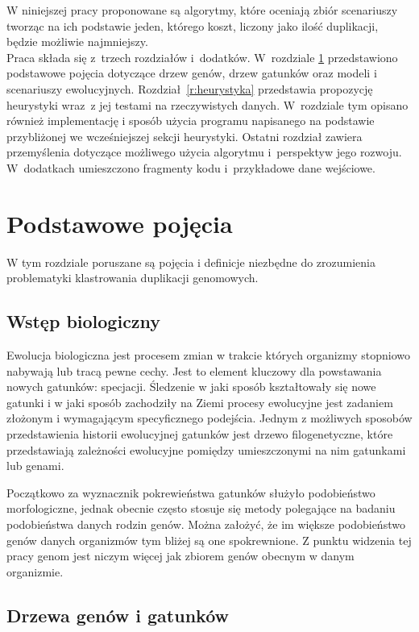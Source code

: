 \documentclass[licencjacka]{pracamgr}
\begin{document}
W niniejszej pracy proponowane są algorytmy, które oceniają zbiór scenariuszy tworząc na ich podstawie jeden, którego koszt, liczony jako ilość duplikacji, będzie możliwie najmniejszy.
\\
Praca składa się z~trzech rozdziałów i~dodatków.
W~rozdziale \ref{r:pojecia} przedstawiono podstawowe pojęcia dotyczące drzew genów, drzew gatunków oraz modeli i scenariuszy ewolucyjnych.  
Rozdział~\ref{r:heurystyka} przedstawia propozycję heurystyki wraz~z jej testami na rzeczywistych danych.  W~rozdziale tym opisano również implementację i sposób użycia programu napisanego na podstawie przybliżonej we wcześniejszej sekcji heurystyki.
Ostatni rozdział zawiera przemyślenia dotyczące możliwego użycia algorytmu i~perspektyw jego rozwoju. W~dodatkach umieszczono fragmenty kodu i~przykładowe dane wejściowe.

\chapter{Podstawowe pojęcia}\label{r:pojecia}

W tym rozdziale poruszane są pojęcia i definicje niezbędne do zrozumienia problematyki klastrowania duplikacji genomowych. 
\section{Wstęp biologiczny}

Ewolucja biologiczna jest procesem zmian w trakcie których organizmy stopniowo nabywają lub tracą pewne cechy. Jest to element kluczowy dla powstawania nowych gatunków: specjacji. Śledzenie w jaki sposób kształtowały się nowe gatunki i w jaki sposób zachodziły na Ziemi procesy ewolucyjne jest zadaniem złożonym i wymagającym specyficznego podejścia. Jednym z możliwych sposobów przedstawienia historii ewolucyjnej gatunków jest drzewo filogenetyczne, które przedstawiają zależności ewolucyjne pomiędzy umieszczonymi na nim gatunkami lub genami. 

Początkowo za wyznacznik pokrewieństwa gatunków służyło podobieństwo morfologiczne, jednak obecnie często stosuje się metody polegające na badaniu podobieństwa danych rodzin genów. Można założyć, że im większe podobieństwo genów danych organizmów tym bliżej są one spokrewnione. Z punktu widzenia tej pracy genom jest niczym więcej jak zbiorem genów obecnym w danym organizmie. 


\section{Drzewa genów i gatunków}
\end{document}
